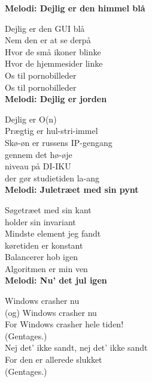 \vspace{-3mm}

\vspace{-1mm}
\textbf{Melodi: Dejlig er den himmel blå}

Dejlig er den GUI blå\\
Nem den er at se derpå\\
Hvor de små ikoner blinke\\
Hvor de hjemmesider linke\\
Os til pornobilleder\\
Os til pornobilleder\\


\vspace{-1mm}
\textbf{Melodi: Dejlig er jorden}

Dejlig er O(n)\\
Prægtig er hul-stri-immel\\
Skø-øn er russens IP-gengang\\
gennem det hø-øje\\
niveau på DI-IKU\\
der gør studietiden la-ang\\


\vspace{-1mm}
\textbf{Melodi: Juletræet med sin pynt}

Søgetræet med sin kant\\
holder sin invariant\\
Mindste element jeg fandt\\
køretiden er konstant\\
Balancerer hob igen\\
Algoritmen er min ven\\


\vspace{-1mm}
\textbf{Melodi: Nu' det jul igen}

Windows crasher nu\\
(og) Windows crasher nu\\
For Windows crasher hele tiden!\\
(Gentages.)\\

Nej det' ikke sandt, nej det' ikke sandt\\
For den er allerede slukket\\
(Gentages.)\\
